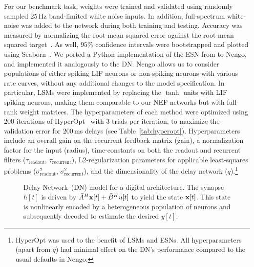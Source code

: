 For our benchmark task, weights were trained and validated using randomly sampled $25$\,Hz band-limited white noise inputs.
In addition, full-spectrum white-noise was added to the network during both training and testing.
Accuracy was measured by normalizing the root-mean squared error against the root-mean squared target~\citep[NRMSE;][]{lukovsevicius2012reservoir}.
As well, $95\%$ confidence intervals were bootstrapped and plotted using Seaborn~\citep{michael_waskom_2015_19108}.
We ported a Python implementation of the ESN from \cite{lukovsevivcius2009reservoir} to Nengo, and implemented it analogously to the DN.
Nengo allows us to consider populations of either spiking LIF neurons or non-spiking neurons with various rate curves, without any additional changes to the model specification.
In particular, LSMs were implemented by replacing the $\tanh$ units with LIF spiking neurons, making them comparable to our NEF networks but with full-rank weight matrices.
The hyperparameters of each method were optimized using $200$ iterations of HyperOpt~\citep{bergstra2013making} with $3$ trials per iteration, to maximize the validation error for $200$\,ms delays (see Table~\ref{tab:hyperopt}).
Hyperparameters include an overall gain on the recurrent feedback matrix (gain), a normalization factor for the input (radius), time-constants on both the readout and recurrent filters ($\tau_\text{readout}$, $\tau_\text{recurrent}$), L2-regularization parameters for applicable least-squares problems ($\sigma^2_\text{readout}$, $\sigma^2_\text{recurrent}$), and the dimensionality of the delay network ($q$).\footnote{%
HyperOpt was used to the benefit of LSMs and ESNs. All hyperparameters (apart from $q$) had minimal effect on the DN's performance compared to the usual defaults in Nengo.}

\begin{figure}
\centering
  \caption{ \label{fig:delay-architecture}
    Delay Network~(DN) model for a digital architecture.
    The synapse $h[t]$ is driven by $\bar{A}^H \mathbf{x}[t] + \bar{B}^H u[t]$ to yield the state $\mathbf{x}[t]$.
    This state is nonlinearly encoded by a heterogeneous population of neurons and subsequently decoded to estimate the desired $y[t]$.
  } 
\end{figure}

